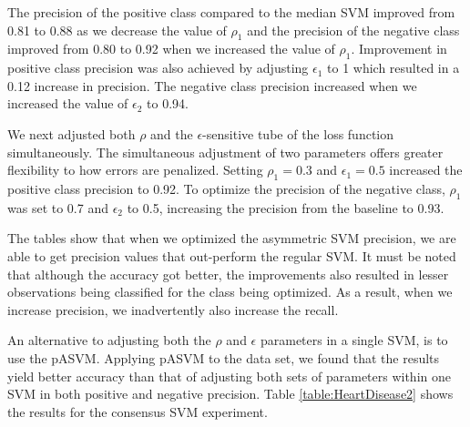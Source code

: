 \documentclass[twoside,11pt]{article}
\begin{document}
The precision of the positive class compared to the median SVM improved from 0.81 to 0.88 as we decrease the value of $\rho_1$ and the precision of the negative class improved from 0.80 to 0.92 when we increased the value of $\rho_1$. Improvement in positive class precision was also achieved by adjusting $\epsilon_1$ to 1 which resulted in a 0.12 increase in precision. The negative class precision increased when we increased the value of $\epsilon_2$ to 0.94. 


We next adjusted both $\rho$ and the $\epsilon$-sensitive tube of the loss function simultaneously. The simultaneous adjustment of two parameters offers greater flexibility to how errors are penalized. Setting $\rho_1=0.3$ and $\epsilon_1=0.5$ increased the positive class precision to 0.92. To optimize the precision of the negative class, $\rho_1$ was set to 0.7 and $\epsilon_2$ to 0.5, increasing the precision from the baseline to 0.93. 

The tables show that when we optimized the asymmetric SVM precision, we are able to get precision values that out-perform the regular SVM. It must be noted that although the accuracy got better, the improvements also resulted in lesser observations being classified for the class being optimized. As a result, when we increase precision, we inadvertently also increase the recall. 

An alternative to adjusting both the $\rho$ and $\epsilon$ parameters in a single SVM, is to use the pASVM. Applying pASVM to the data set, we found that the results yield better accuracy than that of adjusting both sets of parameters within one SVM in both positive and negative precision. Table \ref{table:HeartDisease2} shows the results for the consensus SVM experiment. 
\end{document}
